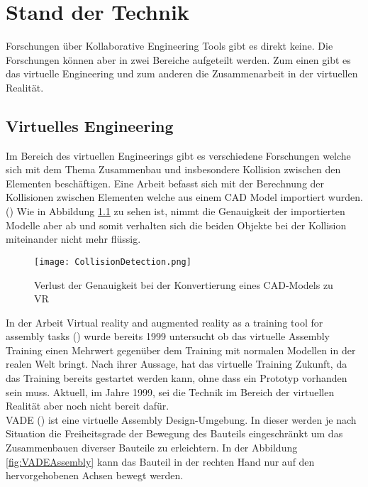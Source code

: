 \chapter{Stand der Technik}
\label{ch:StandDerTechnik}

Forschungen über Kollaborative Engineering Tools gibt es direkt keine. Die Forschungen können aber in zwei Bereiche aufgeteilt werden. Zum einen gibt es das virtuelle Engineering und zum anderen die Zusammenarbeit in der virtuellen Realität.

\section{Virtuelles Engineering}

Im Bereich des virtuellen Engineerings gibt es verschiedene Forschungen welche sich mit dem Thema Zusammenbau und insbesondere Kollision zwischen den Elementen beschäftigen.
Eine Arbeit befasst sich mit der Berechnung der Kollisionen zwischen Elementen welche aus einem CAD Model importiert wurden. (\cite{tching_interactive_2010})
Wie in Abbildung \ref{fig:LossOfAccuracy} zu sehen ist, nimmt die Genauigkeit der importierten Modelle aber ab und somit verhalten sich die beiden Objekte bei der Kollision miteinander nicht mehr flüssig.

\begin{figure}[h!]
	\centering
	\texttt{[image: CollisionDetection.png]}
	\caption{Verlust der Genauigkeit bei der Konvertierung eines CAD-Models zu VR}
	\label{fig:LossOfAccuracy}
\end{figure}

In der Arbeit \grqq Virtual reality and augmented reality as a training tool for assembly tasks\grqq{} (\cite{boud_virtual_1999}) wurde bereits 1999 untersucht ob das virtuelle Assembly Training einen Mehrwert gegenüber dem Training mit normalen Modellen in der realen Welt bringt. Nach ihrer Aussage, hat das virtuelle Training Zukunft, da das Training bereits gestartet werden kann, ohne dass ein Prototyp vorhanden sein muss. Aktuell, im Jahre 1999, sei die Technik im Bereich der virtuellen Realität aber noch nicht bereit dafür. \\

\noindent VADE (\cite{tirumali_vade:_1999}) ist eine virtuelle Assembly Design-Umgebung. In dieser werden je nach Situation die Freiheitsgrade der Bewegung des Bauteils eingeschränkt um das Zusammenbauen diverser Bauteile zu erleichtern. 
In der Abbildung \ref{fig:VADEAssembly} kann das Bauteil in der rechten Hand nur auf den hervorgehobenen Achsen bewegt werden.

